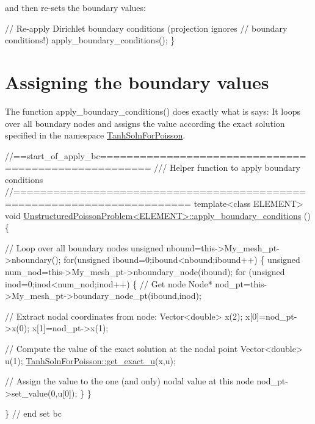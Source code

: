 and then re-\/sets the boundary values\+:


\begin{DoxyCodeInclude}
 
 \textcolor{comment}{// Re-apply Dirichlet boundary conditions (projection ignores}
 \textcolor{comment}{// boundary conditions!)}
 apply\_boundary\_conditions();
\}

\end{DoxyCodeInclude}




 

\hypertarget{index_bc}{}\section{Assigning the boundary values}\label{index_bc}
The function {\ttfamily apply\+\_\+boundary\+\_\+conditions()} does exactly what is says\+: It loops over all boundary nodes and assigns the value according the exact solution specified in the namespace {\ttfamily \hyperlink{namespaceTanhSolnForPoisson}{Tanh\+Soln\+For\+Poisson}}.


\begin{DoxyCodeInclude}
\textcolor{comment}{//==start\_of\_apply\_bc=====================================================}
\textcolor{comment}{ /// Helper function to apply boundary conditions}
\textcolor{comment}{}\textcolor{comment}{//========================================================================}
\textcolor{keyword}{template}<\textcolor{keyword}{class} ELEMENT>
\textcolor{keywordtype}{void} \hyperlink{classUnstructuredPoissonProblem_ace8b8b3097ae2024a0589b2bf9b4ee7b}{UnstructuredPoissonProblem<ELEMENT>::apply\_boundary\_conditions}
      ()
\{
 
 \textcolor{comment}{// Loop over all boundary nodes}
 \textcolor{keywordtype}{unsigned} nbound=this->My\_mesh\_pt->nboundary();
 \textcolor{keywordflow}{for}(\textcolor{keywordtype}{unsigned} ibound=0;ibound<nbound;ibound++)
  \{
   \textcolor{keywordtype}{unsigned} num\_nod=this->My\_mesh\_pt->nboundary\_node(ibound);
   \textcolor{keywordflow}{for} (\textcolor{keywordtype}{unsigned} inod=0;inod<num\_nod;inod++)
    \{
     \textcolor{comment}{// Get node}
     Node* nod\_pt=this->My\_mesh\_pt->boundary\_node\_pt(ibound,inod);
     
     \textcolor{comment}{// Extract nodal coordinates from node:}
     Vector<double> x(2);
     x[0]=nod\_pt->x(0);
     x[1]=nod\_pt->x(1);
     
     \textcolor{comment}{// Compute the value of the exact solution at the nodal point}
     Vector<double> u(1);
     \hyperlink{namespaceTanhSolnForPoisson_af7896e9c18ce6438c73ae2a875e8b7de}{TanhSolnForPoisson::get\_exact\_u}(x,u);
     
     \textcolor{comment}{// Assign the value to the one (and only) nodal value at this node}
     nod\_pt->set\_value(0,u[0]);
    \}
  \} 

\} \textcolor{comment}{// end set bc}

\end{DoxyCodeInclude}




